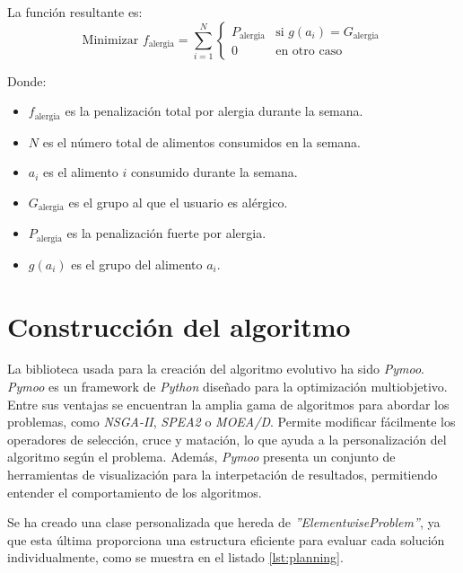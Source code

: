La función resultante es:
\[
\text{Minimizar } f_{\text{alergia}} = \sum_{i=1}^{N} 
\begin{cases} 
P_{\text{alergia}} & \text{si } g(a_i) = G_{\text{alergia}} \\
0 & \text{en otro caso}
\end{cases}
\]
\begin{small}
    Donde:
    \begin{itemize}
    \item \( f_{\text{alergia}} \) es la penalización total por alergia durante la semana.
    \item \( N \) es el número total de alimentos consumidos en la semana.
    \item \( a_i \) es el alimento \( i \) consumido durante la semana.
    \item \( G_{\text{alergia}} \) es el grupo al que el usuario es alérgico.
    \item \( P_{\text{alergia}} \) es la penalización fuerte por alergia.
    \item \( g(a_i) \) es el grupo del alimento \( a_i \).
    \end{itemize}
\end{small}

\section{Construcción del algoritmo}
\label{ch:explicacion-algoritmo}

La biblioteca usada para la creación del algoritmo evolutivo ha sido \textit{Pymoo}. \textit{Pymoo} es un framework de \textit{Python} diseñado para la optimización multiobjetivo. Entre sus ventajas se encuentran la amplia gama de algoritmos para abordar los problemas, como \textit{NSGA-II}, \textit{SPEA2} o \textit{MOEA/D}. Permite modificar fácilmente los operadores de selección, cruce y matación, lo que ayuda a la personalización del algoritmo según el problema. Además, \textit{Pymoo} presenta un conjunto de herramientas de visualización para la interpetación de resultados, permitiendo entender el comportamiento de los algoritmos.~\cite{pymoo}

Se ha creado una clase personalizada que hereda de \textit{''ElementwiseProblem''}, ya que esta última proporciona una estructura eficiente para evaluar cada solución individualmente, como se muestra en el listado \ref{lst:planning}.

